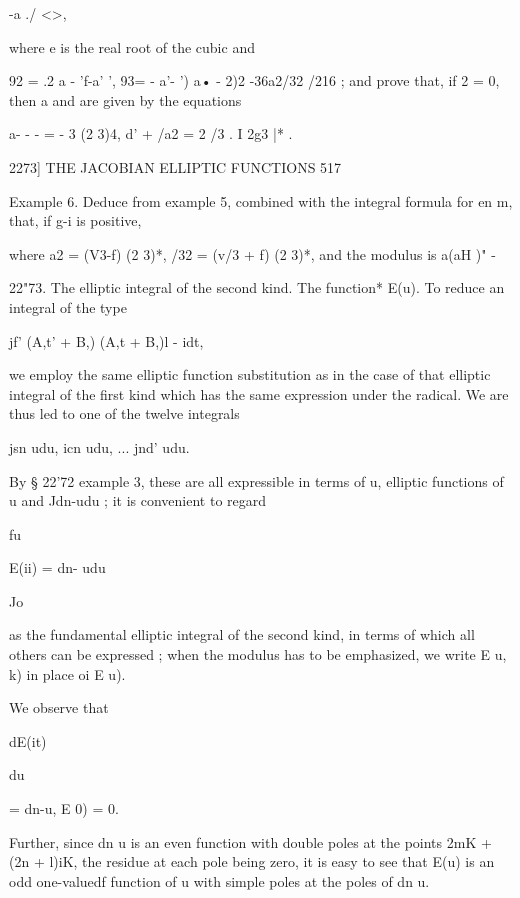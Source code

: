 -a ./ <>,

where e is the real root of the cubic and

92 = .2 a - 'f-a' ', 93= - a'- ') a• - 2)2 -36a2/32 /216 ; and prove
that, if 2 = 0, then a and are given by the equations

a- - - = - 3 (2 3)4, d' + /a2 = 2 /3 . I 2g3 |* .



2273] THE JACOBIAN ELLIPTIC FUNCTIONS 517

Example 6. Deduce from example 5, combined with the integral formula
for en m, that, if g-i is positive,

where a2 = (V3-f) (2 3)*, /32 = (v/3 + f) (2 3)*, and the modulus is
a(aH )" -

22"73. The elliptic integral of the second kind. The function* E(u).
To reduce an integral of the type

jf' (A,t' + B,) (A,t + B,)l - idt,

we employ the same elliptic function substitution as in the case of
that elliptic integral of the first kind which has the same expression
under the radical. We are thus led to one of the twelve integrals



jsn udu, icn udu, ... jnd' udu.



By § 22'72 example 3, these are all expressible in terms of u,
elliptic functions of u and Jdn-udu ; it is convenient to regard

fu

E(ii) = dn- udu



Jo



as the fundamental elliptic integral of the second kind, in terms of
which all others can be expressed ; when the modulus has to be
emphasized, we write E u, k) in place oi E u).

We observe that

dE(it)



du



= dn-u, E 0) = 0.



Further, since dn u is an even function with double poles at the
points 2mK + (2n + l)iK, the residue at each pole being zero, it is
easy to see that E(u) is an odd one-valuedf function of u with simple
poles at the poles of dn u.


